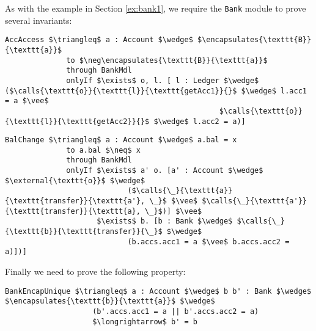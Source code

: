 As with the example in Section \ref{ex:bank1}, we require 
the \verb|Bank| module to prove several invariants:
\begin{lstlisting}[language = Chainmail, mathescape=true, frame=lines]
AccAccess $\triangleq$ a : Account $\wedge$ $\encapsulates{\texttt{B}}{\texttt{a}}$
              to $\neg\encapsulates{\texttt{B}}{\texttt{a}}$
              through BankMdl
              onlyIf $\exists$ o, l. [ l : Ledger $\wedge$ ($\calls{\texttt{o}}{\texttt{l}}{\texttt{getAcc1}}{}$ $\wedge$ l.acc1 = a $\vee$ 
                                                 $\calls{\texttt{o}}{\texttt{l}}{\texttt{getAcc2}}{}$ $\wedge$ l.acc2 = a)]
\end{lstlisting}
\begin{lstlisting}[language = Chainmail, mathescape=true, frame=lines]
BalChange $\triangleq$ a : Account $\wedge$ a.bal = x
              to a.bal $\neq$ x
              through BankMdl
              onlyIf $\exists$ a' o. [a' : Account $\wedge$ $\external{\texttt{o}}$ $\wedge$ 
                            ($\calls{\_}{\texttt{a}}{\texttt{transfer}}{\texttt{a'}, \_}$ $\vee$ $\calls{\_}{\texttt{a'}}{\texttt{transfer}}{\texttt{a}, \_}$)] $\vee$
                     $\exists$ b. [b : Bank $\wedge$ $\calls{\_}{\texttt{b}}{\texttt{transfer}}{\_}$ $\wedge$ 
                            (b.accs.acc1 = a $\vee$ b.accs.acc2 = a)])]
\end{lstlisting}
Finally we need to prove the following property:
\begin{lstlisting}[language = Chainmail, mathescape=true, frame=lines]
BankEncapUnique $\triangleq$ a : Account $\wedge$ b b' : Bank $\wedge$ $\encapsulates{\texttt{b}}{\texttt{a}}$ $\wedge$
                    (b'.accs.acc1 = a || b'.accs.acc2 = a)
                    $\longrightarrow$ b' = b
\end{lstlisting}



